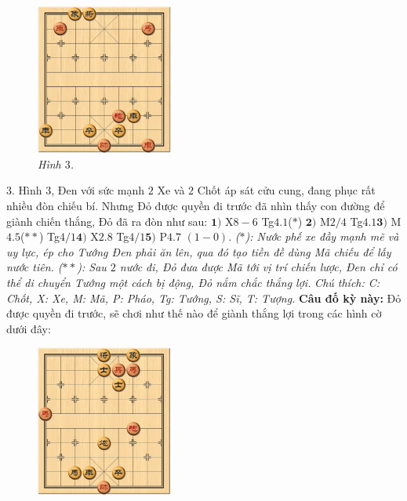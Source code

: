 \begin{multicols}{2}
	\begin{figure}[H]
		\vspace*{-5pt}
		\centering
		\captionsetup{labelformat= empty, justification=centering}
		\includegraphics[width= 0.4\textwidth]{3}
		\caption{\small\textit{\color{gocco}Hình $3$.}}
		\vspace*{-10pt}
	\end{figure}
	$3.$ Hình $3$, Đen với sức mạnh $2$ Xe và $2$ Chốt áp sát cửu cung, đang phục rất nhiều đòn chiếu bí. Nhưng Đỏ được quyền đi trước đã nhìn thấy con đường để giành chiến thắng, Đỏ đã  ra đòn như sau: 
	\vskip 0.1cm
	$\pmb{1)}$	X$8-6$ Tg$4.1$($*$) \quad$\pmb{2)}$ M$2/4$ Tg$4.1$\quad $\pmb{3)}$ M$4.5$($**$) Tg$4/1$\quad $\pmb{4)}$ X$2.8$ Tg$4/1$\quad $\pmb{5)}$ P$4.7$ $(1-0)$.
	\vskip 0.1cm
	\textit{($*$): Nước phế xe đầy mạnh mẽ và uy lực, ép cho Tướng Đen phải ăn lên, qua đó tạo tiền đề dùng Mã chiếu để lấy nước tiên.
	\vskip 0.1cm
	($**$):  Sau $2$ nước đi, Đỏ đưa được Mã tới vị trí chiến lược, Đen chỉ có thể di chuyển Tướng một cách bị động, Đỏ nắm chắc \linebreak thắng lợi.}
	\vskip 0.1cm
	\textit{Chú thích: C: Chốt, X: Xe, M: Mã, P: Pháo, Tg: Tướng, S: Sĩ, T: Tượng.}
	\vskip 0.1cm
	\textbf{\color{gocco}Câu đố kỳ này:} Đỏ được quyền đi trước, sẽ chơi như thế nào để giành thắng lợi trong các hình cờ dưới đây:
	\begin{figure}[H]
		\vspace*{5pt}
		\centering
		\captionsetup{labelformat= empty, justification=centering}
		\includegraphics[width= 0.4\textwidth]{4}

\end{figure}
\end{multicols}
